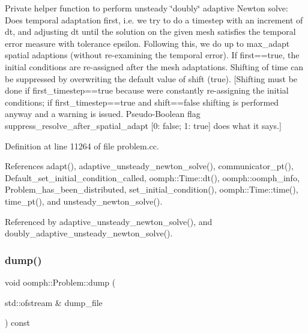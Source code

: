 Private helper function to perform unsteady \char`\"{}doubly\char`\"{} adaptive Newton solve\+: Does temporal adaptation first, i.\+e. we try to do a timestep with an increment of dt, and adjusting dt until the solution on the given mesh satisfies the temporal error measure with tolerance epsilon. Following this, we do up to max\+\_\+adapt spatial adaptions (without re-\/examining the temporal error). If first==true, the initial conditions are re-\/assigned after the mesh adaptations. Shifting of time can be suppressed by overwriting the default value of shift (true). \mbox{[}Shifting must be done if first\+\_\+timestep==true because we\textquotesingle{}re constantly re-\/assigning the initial conditions; if first\+\_\+timestep==true and shift==false shifting is performed anyway and a warning is issued. Pseudo-\/\+Boolean flag suppress\+\_\+resolve\+\_\+after\+\_\+spatial\+\_\+adapt \mbox{[}0\+: false; 1\+: true\mbox{]} does what it says.\mbox{]} 

Definition at line 11264 of file problem.\+cc.



References adapt(), adaptive\+\_\+unsteady\+\_\+newton\+\_\+solve(), communicator\+\_\+pt(), Default\+\_\+set\+\_\+initial\+\_\+condition\+\_\+called, oomph\+::\+Time\+::dt(), oomph\+::oomph\+\_\+info, Problem\+\_\+has\+\_\+been\+\_\+distributed, set\+\_\+initial\+\_\+condition(), oomph\+::\+Time\+::time(), time\+\_\+pt(), and unsteady\+\_\+newton\+\_\+solve().



Referenced by adaptive\+\_\+unsteady\+\_\+newton\+\_\+solve(), and doubly\+\_\+adaptive\+\_\+unsteady\+\_\+newton\+\_\+solve().

\mbox{\label{classoomph_1_1Problem_a804050357ac754151b86c2aec4dabc2d}} 
\subsubsection{\texorpdfstring{dump()}{dump()}\hspace{0.1cm}{\footnotesize\ttfamily [1/2]}}
{\footnotesize\ttfamily void oomph\+::\+Problem\+::dump (\begin{DoxyParamCaption}\item[{std\+::ofstream \&}]{dump\+\_\+file }\end{DoxyParamCaption}) const\hspace{0.3cm}{\ttfamily [virtual]}}



